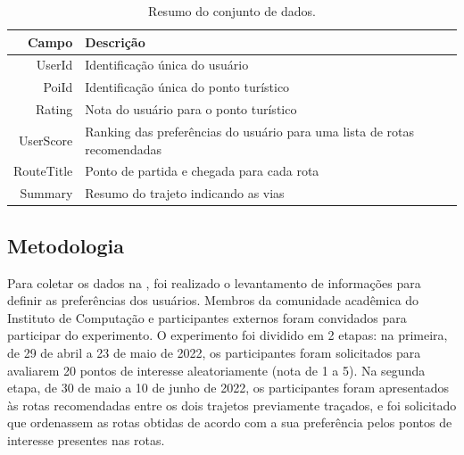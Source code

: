 \documentclass[portuguese]{textolivre}
\begin{document}
\begin{table}[h!]
\caption{Resumo do conjunto de dados.}
\label{tab:dataset}
\begin{tabularx}{\linewidth}{r l X}
\toprule
Campo & Descrição\\
\midrule
UserId & Identificação única do usuário \\
PoiId & Identificação única do ponto turístico\\
Rating & Nota do usuário para o ponto turístico \\
UserScore & Ranking das preferências do usuário para uma lista de rotas recomendadas \\
RouteTitle & Ponto de partida e chegada para cada rota \\
Summary & Resumo do trajeto indicando as vias\\
\bottomrule
\end{tabularx}
\end{table}

\subsection{Metodologia}
Para coletar os dados na , foi realizado o levantamento de informações para definir as preferências dos usuários. Membros da comunidade acadêmica do Instituto de Computação e participantes externos foram convidados para participar do experimento. O experimento foi dividido em 2 etapas: na primeira, de 29 de abril a 23 de maio de 2022, os participantes foram solicitados para avaliarem 20 pontos de interesse aleatoriamente (nota de 1 a 5). Na segunda etapa, de 30 de maio a 10 de junho de 2022, os participantes foram apresentados às rotas recomendadas entre os dois trajetos previamente traçados, e foi solicitado que ordenassem as rotas obtidas de acordo com a sua preferência pelos pontos de interesse presentes nas rotas.
\end{document}
